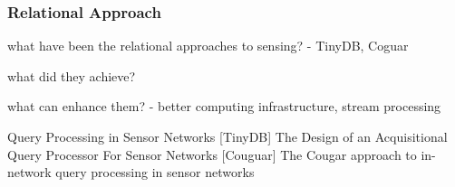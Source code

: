 \subsubsection*{Relational Approach}
\begin{structure}
	\item what have been the relational approaches to sensing? - TinyDB, Coguar
	\item what did they achieve?
	\item what can enhance them? - better computing infrastructure, stream processing
\end{structure}

Query Processing in Sensor Networks \cite{qpsn}
[TinyDB] The Design of an Acquisitional Query Processor For Sensor Networks \cite{tinydb}
[Couguar] The Cougar approach to in-network query processing in sensor networks \cite{coguar}

